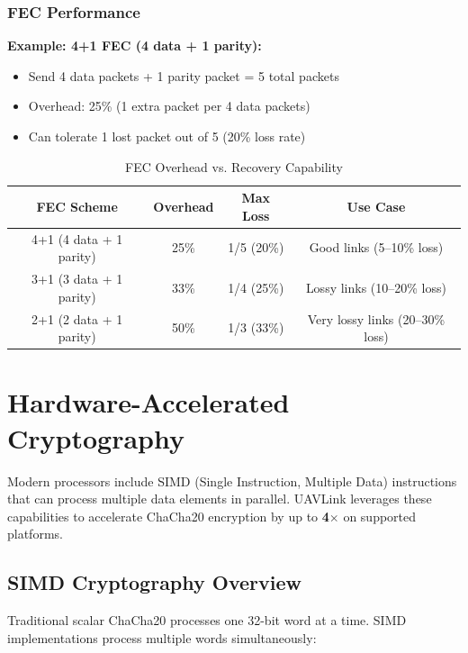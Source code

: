 \documentclass[11pt,a4paper]{article}
\begin{document}
\subsubsection{FEC Performance}

\textbf{Example: 4+1 FEC (4 data + 1 parity):}
\begin{itemize}[noitemsep]
    \item Send 4 data packets + 1 parity packet = 5 total packets
    \item Overhead: 25\% (1 extra packet per 4 data packets)
    \item Can tolerate 1 lost packet out of 5 (20\% loss rate)
\end{itemize}

\begin{table}[H]
\centering
\begin{tabular}{@{}cccc@{}}
\toprule
\textbf{FEC Scheme} & \textbf{Overhead} & \textbf{Max Loss} & \textbf{Use Case} \\
\midrule
4+1 (4 data + 1 parity) & 25\% & 1/5 (20\%) & Good links (5--10\% loss) \\
3+1 (3 data + 1 parity) & 33\% & 1/4 (25\%) & Lossy links (10--20\% loss) \\
2+1 (2 data + 1 parity) & 50\% & 1/3 (33\%) & Very lossy links (20--30\% loss) \\
\bottomrule
\end{tabular}
\caption{FEC Overhead vs. Recovery Capability}
\end{table}

\newpage
\section{Hardware-Accelerated Cryptography}

Modern processors include SIMD (Single Instruction, Multiple Data) instructions that can process multiple data elements in parallel. UAVLink leverages these capabilities to accelerate ChaCha20 encryption by up to \textbf{4$\times$} on supported platforms.

\subsection{SIMD Cryptography Overview}

Traditional scalar ChaCha20 processes one 32-bit word at a time. SIMD implementations process multiple words simultaneously:
\end{document}
